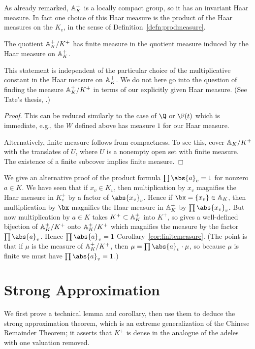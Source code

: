 As already remarked, $\AA_K^+$ is a locally compact group, so it has
an invariant Haar measure.  In fact one choice of this Haar measure is
the product of the Haar measures on the $K_v$, in the sense
of Definition~\ref{defn:prodmeasure}.

\begin{corollary}\label{cor:finitemeasure}
The quotient $\AA_K^+/K^+$ has finite measure in the quotient measure
induced by the Haar measure on $\AA_K^+$.
\end{corollary}
\begin{remark}
This statement is independent of the particular choice
of the multiplicative constant in the Haar measure
on $\AA_K^+$.  We do not here go into the question of
finding the measure $\AA_K^+/K^+$ in terms of our 
explicitly given Haar measure.  (See Tate's thesis,
\cite[Chapter XV]{cassels-frohlich}.)
\end{remark}
\begin{proof}
This can be reduced similarly to the case of $\Q$
or $\F(t)$ which is immediate, e.g., the $W$ defined
above has measure $1$ for our Haar measure.

Alternatively, finite measure follows from compactness.  To see
this,  cover
$\AA_K/K^+$ with the translates of $U$, where $U$ is a nonempty open
set with finite measure.  The existence of a finite subcover implies
finite measure.
\end{proof}

\begin{remark}\label{rem:conceptual_prod}
  We give an alternative proof of the product formula
  $\prod\abs{a}_v=1$ for nonzero $a\in K$.  We have seen that if
  $x_v\in K_v$, then multiplication by $x_v$ magnifies the Haar
  measure in $K_v^+$ by a factor of $\abs{x_v}_v$.  Hence if
  $\bx=\{x_v\}\in\AA_K$, then multiplication by $\bx$ magnifies the
  Haar measure in $\AA_K^+$ by $\prod \abs{x_v}_v$.  But now
  multiplication by $a\in K$ takes $K^+\subset \AA_K^+$ into $K^+$, so
  gives a well-defined bijection of $\AA_K^+/K^+$ onto $\AA_K^+/K^+$
  which magnifies the measure by the factor $\prod\abs{a}_v$.  Hence
  $\prod\abs{a}_v=1$ Corollary~\ref{cor:finitemeasure}.  (The point is
  that if $\mu$ is the measure of $\AA_K^+/K^+$, then $\mu =
  \prod\abs{a}_v \cdot \mu$, so because $\mu$ is finite we must have
  $\prod\abs{a}_v = 1$.)
\end{remark}


\section{Strong Approximation}
We first prove a technical lemma and corollary, then use them to
deduce the strong approximation theorem, which is an extreme
generalization of the Chinese Remainder Theorem; it asserts that $K^+$
is dense in the analogue of the adeles with one valuation removed.


